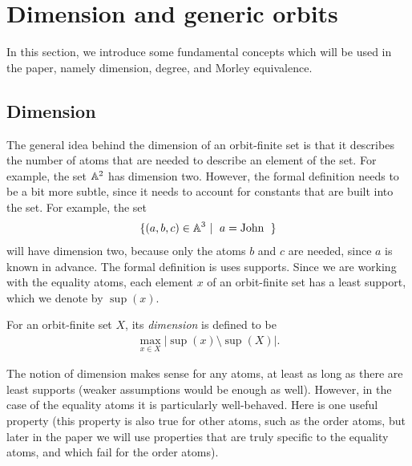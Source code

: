 

\section{Dimension and generic orbits}
\label{sec:generic-orbits}
In this section, we introduce some fundamental concepts which will be used in the paper, namely dimension, degree, and Morley equivalence.

\subsection{Dimension}
\label{sec:dimension}
The general idea behind the dimension of an orbit-finite set is that it describes the number of atoms that are needed to describe an element of the set. For example, the set $\mathbb A^2$ has dimension two. However, the formal definition needs to be a bit more subtle, since it needs to account for constants that are built into the set. For example, the set
\begin{align*}
\setbuild{(a,b,c) \in \atoms^3}{$a = \john$}
\end{align*}
will have dimension two, because only the atoms $b$ and $c$ are needed, since $a$ is known in advance. The formal definition is uses supports. Since we are  working with the equality atoms, each element $x$ of an orbit-finite set has a least support, which we denote by $\sup(x)$.
\begin{definition}
	[Dimension] \label{def:dimension} For an orbit-finite set $X$, its \emph{dimension} is defined to be
	\begin{align*}
		\max_{x \in X} |\sup(x) \setminus \sup(X)|.
	\end{align*}
\end{definition}
The notion of dimension makes sense for any atoms, at least as long as there are least supports (weaker assumptions would be enough as well). However, in the case of the equality atoms it is particularly well-behaved. Here is one useful property (this property is also true for other atoms, such as the order atoms, but later in the paper we will use properties that are truly specific to the equality atoms, and which fail for the order atoms).

